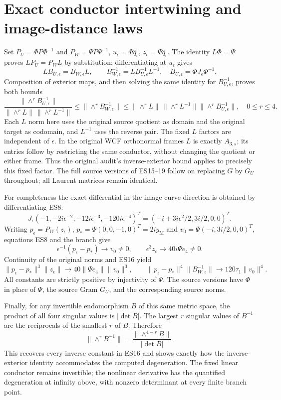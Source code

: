 \documentclass[11pt]{article}
\begin{document}
\section{Exact conductor intertwining and image-distance laws}
Set $P_U=\Phi P\Phi^{-1}$ and $P_W=\Psi P\Psi^{-1}$,
$u_\epsilon=\Phi\widehat q_\epsilon$,
$z_\epsilon=\Psi\widehat q_\epsilon$. The identity $L\Phi=\Psi$
proves $LP_U=P_WL$ by substitution; differentiating at
$u_\epsilon$ gives
\[
 LB_{U,\epsilon}=B_{W,\epsilon}L,\qquad
 B_{W,\epsilon}^{-1}=LB_{U,\epsilon}^{-1}L^{-1},
 \quad B_{U,\epsilon}=\Phi J_\epsilon\Phi^{-1}.
 \tag{ES20}
\]
Composition of exterior maps, and then solving the same identity
for $B_{U,\epsilon}^{-1}$, proves both bounds
\[
 \frac{\|\wedge^rB_{U,\epsilon}^{-1}\|}
 {\|\wedge^rL\|\,\|\wedge^rL^{-1}\|}
 \le\|\wedge^rB_{W,\epsilon}^{-1}\|
 \le\|\wedge^rL\|\,\|\wedge^rL^{-1}\|
       \|\wedge^rB_{U,\epsilon}^{-1}\|,
 \quad 0\le r\le4.
 \tag{ES21}
\]
Each $L$ norm here uses the original source quotient as domain and
the original target as codomain, and $L^{-1}$ uses the reverse
pair. The fixed $L$ factors are independent of $\epsilon$.
In the original WCF orthonormal frames $L$ is exactly $A_{3,s}$;
its entries follow by restricting the same conductor, without
changing the quotient or either frame. Thus the original audit's
inverse-exterior bound applies to precisely this fixed factor.
The full source versions of ES15--19 follow on replacing $G$ by
$G_U$ throughout; all Laurent matrices remain identical.

For completeness the exact differential in the image-curve
direction is obtained by differentiating ES8:
\[
 J_\epsilon(-1,-2i\epsilon^{-2},-12i\epsilon^{-3},-120i\epsilon^{-4})^T
 =(-i+3i\epsilon^2/2,3i/2,0,0)^T.
 \tag{ES22}
\]
Writing $p_\epsilon=P_W(z_\epsilon)$,
$p_*=\Psi(0,0,-1,0)^T=2iy_{\mathrm M}$ and
$v_0=\Psi(-i,3i/2,0,0)^T$, equations ES8 and the branch give
\[
 \epsilon^{-1}(p_\epsilon-p_*)\longrightarrow v_0\ne0,
 \qquad \epsilon^3z_\epsilon\longrightarrow40i\Psi e_4\ne0.
\]
Continuity of the original norms and ES16 yield
\[
 \|p_\epsilon-p_*\|^3\|z_\epsilon\|
 \longrightarrow40\|\Psi e_4\|\|v_0\|^3,
 \qquad
 \|p_\epsilon-p_*\|^4\|B_{W,\epsilon}^{-1}\|
 \longrightarrow120\tau_1\|v_0\|^4.
 \tag{ES23}
\]
All constants are strictly positive by injectivity of $\Psi$.
The source versions have $\Phi$ in place of $\Psi$, the source
Gram $G_U$, and the corresponding source norms.

Finally, for any invertible endomorphism $B$ of this same metric
space, the product of all four singular values is $|\det B|$.
The largest $r$ singular values of $B^{-1}$ are the reciprocals of
the smallest $r$ of $B$. Therefore
\[
 \|\wedge^rB^{-1}\|=\frac{\|\wedge^{4-r}B\|}{|\det B|}.
 \tag{ES24}
\]
This recovers every inverse constant in ES16 and shows exactly
how the inverse-exterior identity accommodates the computed
degeneration. The fixed linear conductor remains invertible;
the nonlinear derivative has the quantified degeneration at
infinity above, with nonzero determinant at every finite branch
point.
\end{document}
